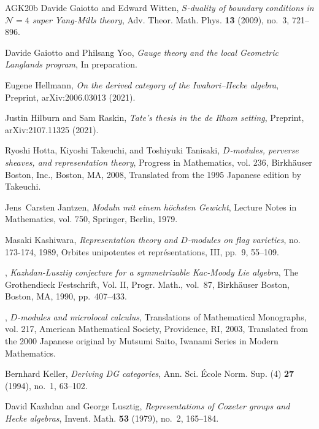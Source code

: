 \begin{thebibliography}{AGK{\etalchar{+}}20b}
Davide Gaiotto and Edward Witten, \emph{{$S$}-duality of boundary conditions in
  {$\mathscr N=4$} super {Y}ang-{M}ills theory}, Adv. Theor. Math. Phys.
  \textbf{13} (2009), no.~3, 721--896.

Davide Gaiotto and Philsang Yoo, \emph{Gauge theory and the local {G}eometric
  {L}anglands program}, In preparation.

Eugene Hellmann, \emph{On the derived category of the {I}wahori--{H}ecke
  algebra}, Preprint, arXiv:2006.03013 (2021).

Justin Hilburn and Sam Raskin, \emph{Tate's thesis in the de {R}ham setting},
  Preprint, arXiv:2107.11325 (2021).

Ryoshi Hotta, Kiyoshi Takeuchi, and Toshiyuki Tanisaki, \emph{{$D$}-modules,
  perverse sheaves, and representation theory}, Progress in Mathematics, vol.
  236, Birkh\"{a}user Boston, Inc., Boston, MA, 2008, Translated from the 1995
  Japanese edition by Takeuchi.

Jens~Carsten Jantzen, \emph{Moduln mit einem h\"{o}chsten {G}ewicht}, Lecture
  Notes in Mathematics, vol. 750, Springer, Berlin, 1979.

Masaki Kashiwara, \emph{Representation theory and {$D$}-modules on flag
  varieties}, no. 173-174, 1989, Orbites unipotentes et repr\'{e}sentations,
  III, pp.~9, 55--109.

\bysame, \emph{Kazhdan-{L}usztig conjecture for a symmetrizable {K}ac-{M}oody
  {L}ie algebra}, The {G}rothendieck {F}estschrift, {V}ol. {II}, Progr. Math.,
  vol.~87, Birkh\"{a}user Boston, Boston, MA, 1990, pp.~407--433.

\bysame, \emph{{$D$}-modules and microlocal calculus}, Translations of
  Mathematical Monographs, vol. 217, American Mathematical Society, Providence,
  RI, 2003, Translated from the 2000 Japanese original by Mutsumi Saito,
  Iwanami Series in Modern Mathematics.

Bernhard Keller, \emph{Deriving {DG} categories}, Ann. Sci. \'{E}cole Norm.
  Sup. (4) \textbf{27} (1994), no.~1, 63--102.

David Kazhdan and George Lusztig, \emph{Representations of {C}oxeter groups and
  {H}ecke algebras}, Invent. Math. \textbf{53} (1979), no.~2, 165--184.


\end{thebibliography}
